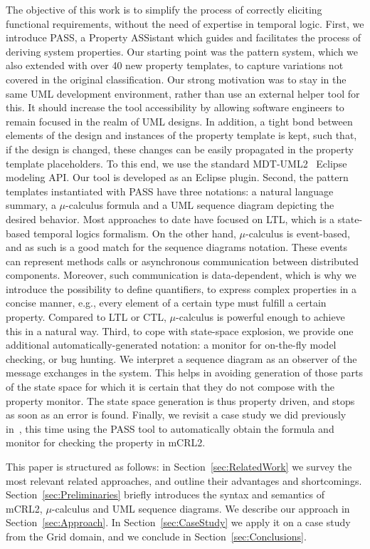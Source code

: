 \documentclass[letter]{llncs}
\begin{document}
The objective of this work is to simplify the process of correctly eliciting
functional requirements, without the need of expertise in temporal logic. 
First, we introduce PASS, a Property ASSistant which guides and facilitates the process of deriving
system properties. Our starting point was the pattern system,
which we also extended with over 40 new property templates, to capture variations not covered 
in the original classification. Our strong motivation was to stay
in the same UML development environment, rather than use an external helper tool for this.
It should increase the tool accessibility by allowing software engineers to remain focused in the realm of UML designs.
In addition, a tight bond between elements of the design and instances of the property template is kept, such that, if the 
design is changed, these changes can be easily propagated in the property template placeholders. 
To this end, we use the standard MDT-UML2~\cite{MDTUML2} Eclipse modeling API. Our tool is developed as an Eclipse plugin.
Second, the pattern templates instantiated with PASS have three notations: a natural language summary, a $\mu$-calculus formula
and a UML sequence diagram depicting the desired behavior. Most approaches to date 
have focused on LTL, which is a state-based temporal logics formalism. On the other hand,
 $\mu$-calculus is event-based, and as such is a good match for the sequence diagrams notation. 
These events can represent methods calls or asynchronous communication between distributed components.
Moreover, such communication is data-dependent, which is why we introduce
the possibility to define quantifiers, to express complex properties in a concise manner, e.g., every
element of a certain type must fulfill a certain property. 
Compared to LTL or CTL,  $\mu$-calculus is powerful enough
to achieve this in a natural way. Third, to cope with state-space explosion,
we provide one additional automatically-generated notation: a monitor for on-the-fly model checking, or bug hunting.
We interpret a sequence diagram as an observer of the message exchanges in the system.
This helps in avoiding generation of those parts of the state space for which it is 
certain that they do not compose with the property monitor. The state space
generation is thus property driven, and stops as soon as an error is found.
Finally, we revisit a case study we did previously in~\cite{DBLP:dblp_conf/nfm/RemenskaTWHVCB13}, this time
using the PASS tool to automatically obtain the formula and monitor for checking the property in mCRL2.

This paper is structured as follows: in Section~\ref{sec:RelatedWork} we
 survey the most relevant related approaches,
and outline their advantages and shortcomings. Section~\ref{sec:Preliminaries} briefly introduces the
syntax and semantics of mCRL2, $\mu$-calculus and UML sequence diagrams.
We describe our approach in Section~\ref{sec:Approach}.
In Section~\ref{sec:CaseStudy} we apply it on a case study from the Grid domain, and we conclude in Section~\ref{sec:Conclusions}.
\end{document}
